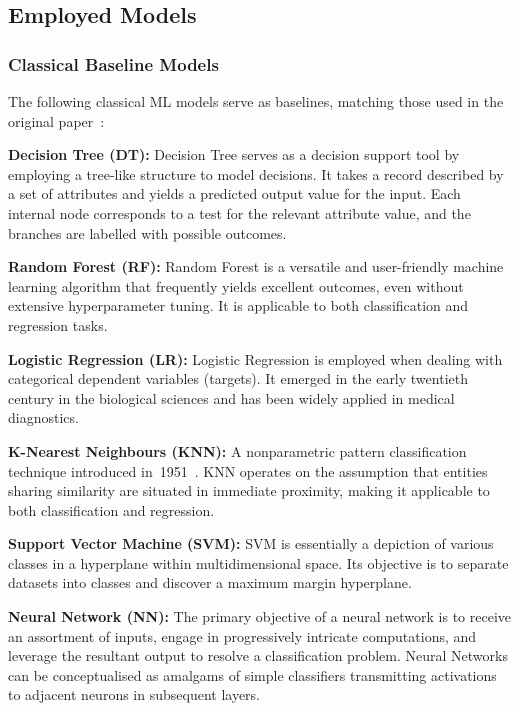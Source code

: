 \documentclass[10pt, twocolumn]{article}
\begin{document}
\subsection{Employed Models}

\subsubsection{Classical Baseline Models}

The following classical ML models serve as baselines, matching those used in the original
paper~\cite{anbuselvan2020}:

\textbf{Decision Tree (DT):}
Decision Tree serves as a decision support tool by employing a tree-like structure to model
decisions. It takes a record described by a set of attributes and yields a predicted output
value for the input. Each internal node corresponds to a test for the relevant attribute value,
and the branches are labelled with possible outcomes.

\textbf{Random Forest (RF):}
Random Forest is a versatile and user-friendly machine learning algorithm that frequently
yields excellent outcomes, even without extensive hyperparameter tuning. It is applicable to
both classification and regression tasks.

\textbf{Logistic Regression (LR):}
Logistic Regression is employed when dealing with categorical dependent variables (targets).
It emerged in the early twentieth century in the biological sciences and has been widely
applied in medical diagnostics.

\textbf{K-Nearest Neighbours (KNN):}
A nonparametric pattern classification technique introduced in~1951~\cite{fix1989}.
KNN operates on the assumption that entities sharing similarity are situated in immediate
proximity, making it applicable to both classification and regression.

\textbf{Support Vector Machine (SVM):}
SVM is essentially a depiction of various classes in a hyperplane within multidimensional
space. Its objective is to separate datasets into classes and discover a maximum margin
hyperplane.

\textbf{Neural Network (NN):}
The primary objective of a neural network is to receive an assortment of inputs, engage
in progressively intricate computations, and leverage the resultant output to resolve a
classification problem. Neural Networks can be conceptualised as amalgams of simple
classifiers transmitting activations to adjacent neurons in subsequent layers.
\end{document}
